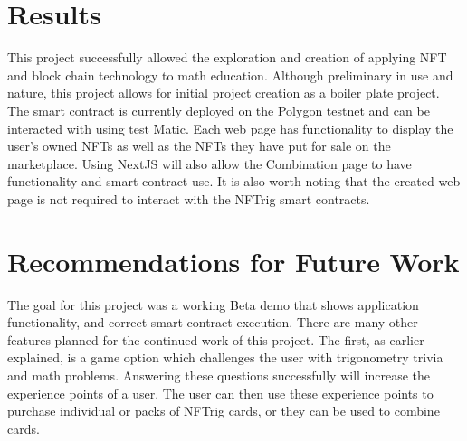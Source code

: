 \documentclass[acmsmall,nonacm]{acmart}
\begin{document}
\section{Results}
This project successfully allowed the exploration and creation of applying NFT and block chain technology to math education. Although preliminary in use and nature, this project allows for initial project creation as a boiler plate project. The smart contract is currently deployed on the Polygon testnet and can be interacted with using test Matic. Each web page has functionality to display the user's owned NFTs as well as the NFTs they have put for sale on the marketplace. Using NextJS will also allow the Combination page to have functionality and smart contract use. It is also worth noting that the created web page is not required to interact with the NFTrig smart contracts. 


\section{Recommendations for Future Work}
The goal for this project was a working Beta demo that shows application functionality, and correct smart contract execution. There are many other features planned for the continued work of this project. The first, as earlier explained, is a game option which challenges the user with trigonometry trivia and math problems. Answering these questions successfully will increase the experience points of a user. The user can then use these experience points to purchase individual or packs of NFTrig cards, or they can be used to combine cards. 



\end{document}
